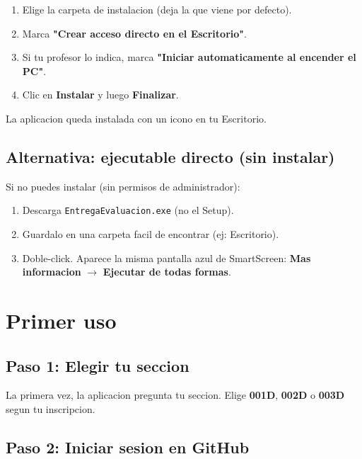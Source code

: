\documentclass[11pt,a4paper,oneside]{report}
\begin{document}
\begin{enumerate}
  \item Elige la carpeta de instalacion (deja la que viene por defecto).
  \item Marca \textbf{"Crear acceso directo en el Escritorio"}.
  \item Si tu profesor lo indica, marca \textbf{"Iniciar automaticamente al
    encender el PC"}.
  \item Clic en \textbf{Instalar} y luego \textbf{Finalizar}.
\end{enumerate}

\begin{successbox}[Listo]
La aplicacion queda instalada con un icono en tu Escritorio.
\end{successbox}

\section{Alternativa: ejecutable directo (sin instalar)}

Si no puedes instalar (sin permisos de administrador):

\begin{enumerate}
  \item Descarga \texttt{EntregaEvaluacion.exe} (no el Setup).
  \item Guardalo en una carpeta facil de encontrar (ej: Escritorio).
  \item Doble-click. Aparece la misma pantalla azul de SmartScreen:
    \textbf{Mas informacion} $\rightarrow$ \textbf{Ejecutar de todas formas}.
\end{enumerate}

\chapter{Primer uso}

\section{Paso 1: Elegir tu seccion}

La primera vez, la aplicacion pregunta tu seccion. Elige \textbf{001D},
\textbf{002D} o \textbf{003D} segun tu inscripcion.

\section{Paso 2: Iniciar sesion en GitHub}
\end{document}
